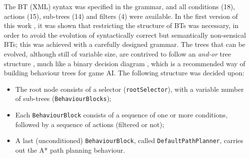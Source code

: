 \documentclass[conference]{IEEEtran}
\begin{document}
The BT (XML) syntax was specified in the grammar, and all
conditions (18), actions (15), sub-trees (14) and filters (4) were available.
%
In the first version of this work \cite{PNO11}, it was shown that restricting
the structure of BTs was necessary, in order to avoid the evolution of
syntactically correct but semantically non-sensical BTs; this was achieved with
a carefully designed grammar.
The trees that can
be evolved, although still of variable size, are contrived to follow
an \textit{and-or} tree structure \cite{Nil98}, much like a binary decision
diagram \cite{Ake78}, which is a recommended \cite{Cha07} way of building
behaviour trees for game AI.
The following structure was decided upon:
\begin{itemize}
	\item The root node consists of a selector (\texttt{rootSelector}),
		with a variable number of sub-trees (\texttt{BehaviourBlocks});
	\item Each \texttt{BehaviourBlock} consists of a sequence of one or
		more conditions, followed by a sequence of actions (filtered or
		not);
	\item A last (unconditioned) \texttt{BehaviourBlock}, called
		\texttt{DefaultPathPlanner}, carries out the A* path
		planning behaviour.
\end{itemize}
\end{document}
